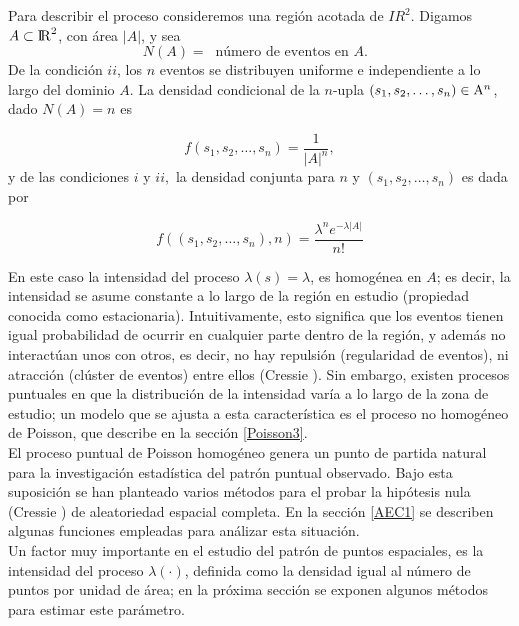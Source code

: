 \documentclass[12pt]{report}
\begin{document}
	Para describir el proceso consideremos una región acotada de ${I\!R}^{2}$. Digamos  $ A \subset {\rm I\!R}^{2} $, con área $|A|$, y sea \[ N(A) =  \: \text{ número de eventos  en  $A.$ }\]  De la condición $ii$, los $n$ eventos se distribuyen uniforme e independiente a lo largo del dominio $A$. La densidad condicional de la $n$-upla $ (s_{1}, s_{2},\dots, s_{n} ) \in   {\rm  A }^{n}$, dado $ N(A) = n $ es 
	
	
	\[f(s_{1}, s_{2},\dots, s_{n} ) = \frac{1  }{|A|^{n}  }  , \]  y de las condiciones  $i$ y $ii,$ la densidad conjunta para $n$ y   $ (s_{1}, s_{2},\dots, s_{n} )$ es dada por 
	
	\[   f((s_{1}, s_{2},\dots, s_{n} ),n) = \frac{ \lambda^{n} e^{-\lambda|A|}}{n!  }  \]
	
	En este caso la intensidad del proceso $\lambda(s) =\lambda $,   es homogénea en $A$; es decir,  la intensidad se asume constante a lo largo de la región en estudio (propiedad conocida como estacionaria). Intuitivamente, esto significa que los eventos tienen igual probabilidad de ocurrir en cualquier parte dentro de la región,  y además no interactúan unos con otros, es decir, no hay repulsión (regularidad de eventos), ni atracción (clúster de eventos) entre ellos (Cressie \cite{Cress}). Sin embargo, existen   procesos puntuales en que la distribución de la intensidad varía a lo largo de la zona de estudio; un modelo que se ajusta a esta característica es el proceso no homogéneo de Poisson, que  describe en la sección \ref{Poisson3}.\\
		
	
		
		El proceso puntual de Poisson homogéneo genera un punto de partida natural para la investigación estadística del patrón puntual observado. Bajo esta suposición se han planteado varios métodos para el probar la hipótesis nula (Cressie \cite{Cress}) de aleatoriedad espacial completa. En la sección \ref{AEC1} se describen algunas funciones empleadas para análizar esta situación.\\
		
		Un factor muy importante en el estudio del patrón de puntos espaciales, es la intensidad del proceso  $\lambda(\cdot)$, definida como la densidad igual al número de puntos por unidad de área; en la próxima sección se exponen algunos  métodos para estimar este parámetro. \\
		
		
		
\end{document}
